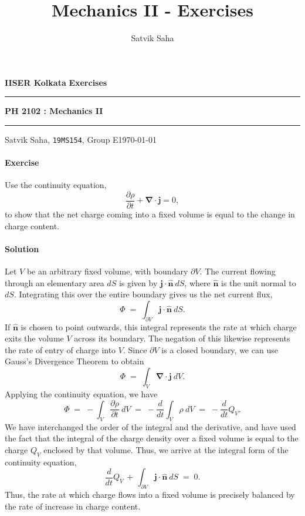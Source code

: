 \documentclass[10pt]{article}
\title{Mechanics II - Exercises}
\author{Satvik Saha}
\date{}
\let\vec\boldsymbol
\newcommand\divg[1]{\vec{\nabla}\cdot#1}
\newcommand\pp[2]{\frac{\partial #1}{\partial #2}}
\newcommand\dd[2]{\frac{d #1}{d #2}}
\newcounter{prob}
\def\problem{\stepcounter{prob}\paragraph{Exercise \arabic{prob}}}
\def\solution{\paragraph{Solution}}
\begin{document}
        \par\textbf{IISER Kolkata} \hfill \textbf{Exercises}
        \vspace{3pt}
        \hrule
        \vspace{3pt}
        \begin{center}
                \LARGE{\textbf{PH 2102 : Mechanics II}}
        \end{center}
        \vspace{3pt}
        \hrule
        \vspace{3pt}
        Satvik Saha, \texttt{19MS154}, Group E\hfill\today
        \vspace{20pt}

        \problem Use the continuity equation,
        \[
                \pp{\rho}{t} + \divg{\vec{j}} = 0,
        \]
        to show that the net charge coming into a fixed volume is equal to the change in charge content.

        \solution Let $V$ be an arbitrary fixed volume, with boundary $\partial V$. The current flowing through an elementary area $dS$
        is given by $\vec{j}\cdot \hat{\vec{n}}\:dS$, where $\hat{\vec{n}}$ is the unit normal to $dS$. Integrating this over
        the entire boundary gives us the net current flux,
        \[
                \Phi \;=\; \int_{\partial V} \vec{j}\cdot \hat{\vec{n}}\:dS.
        \]
        If $\hat{\vec{n}}$ is chosen to point outwards, this integral represents the rate at which charge exits the volume $V$ across its boundary.
        The negation of this likewise represents the rate of entry of charge into $V$.
        Since $\partial V$ is a closed boundary, we can use Gauss's Divergence Theorem to obtain
        \[
                \Phi \;=\; \int_{V} \divg{\vec{j}}\:dV.
        \]
        Applying the continuity equation, we have
        \[
                \Phi \;=\; -\int_{V} \pp{\rho}{t}\:dV \;=\; -\dd{}{t}\int_{V}\rho\:dV \;=\; -\dd{}{t}Q_{V}.
        \]
        We have interchanged the order of the integral and the derivative, and have used the fact that the integral of the charge density
        over a fixed volume is equal to the charge $Q_V$ enclosed by that volume.
        Thus, we arrive at the integral form of the continuity equation,
        \[
                \dd{}{t}Q_{V} \,+\, \int_{\partial V} \vec{j}\cdot \hat{\vec{n}}\:dS \;=\; 0.
        \]
        Thus, the rate at which charge flows into a fixed volume is precisely balanced by the rate of increase in charge content.
\end{document}
